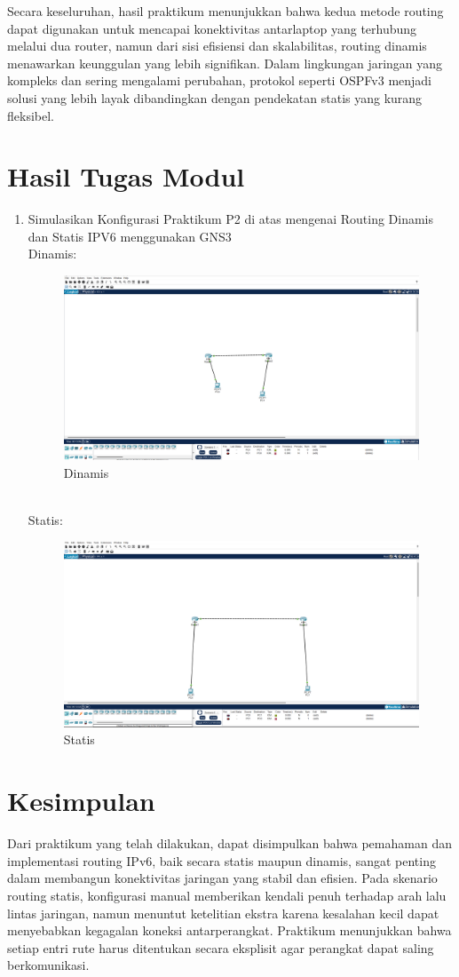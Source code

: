 Secara keseluruhan, hasil praktikum menunjukkan bahwa kedua metode routing dapat digunakan untuk mencapai konektivitas antarlaptop yang terhubung melalui dua router, namun dari sisi efisiensi dan skalabilitas, routing dinamis menawarkan keunggulan yang lebih signifikan. Dalam lingkungan jaringan yang kompleks dan sering mengalami perubahan, protokol seperti OSPFv3 menjadi solusi yang lebih layak dibandingkan dengan pendekatan statis yang kurang fleksibel.

\section{Hasil Tugas Modul}
\begin{enumerate}
    \item Simulasikan Konfigurasi Praktikum P2 di atas mengenai Routing Dinamis dan Statis IPV6 menggunakan GNS3
    \\ Dinamis:
    \begin{figure}[H]
        \centering
        \includegraphics[width=0.5\linewidth]{P1/img/12.png}
        \caption{Dinamis}
        \label{fig:gambar4}
    \end{figure}
  \\ Statis:
  \begin{figure}[H]
        \centering
        \includegraphics[width=0.5\linewidth]{P1/img/13.png}
        \caption{Statis}
        \label{fig:gambar4}
    \end{figure}
  
  

\end{enumerate}

\section{Kesimpulan}
Dari praktikum yang telah dilakukan, dapat disimpulkan bahwa pemahaman dan implementasi routing IPv6, baik secara statis maupun dinamis, sangat penting dalam membangun konektivitas jaringan yang stabil dan efisien. Pada skenario routing statis, konfigurasi manual memberikan kendali penuh terhadap arah lalu lintas jaringan, namun menuntut ketelitian ekstra karena kesalahan kecil dapat menyebabkan kegagalan koneksi antarperangkat. Praktikum menunjukkan bahwa setiap entri rute harus ditentukan secara eksplisit agar perangkat dapat saling berkomunikasi.

